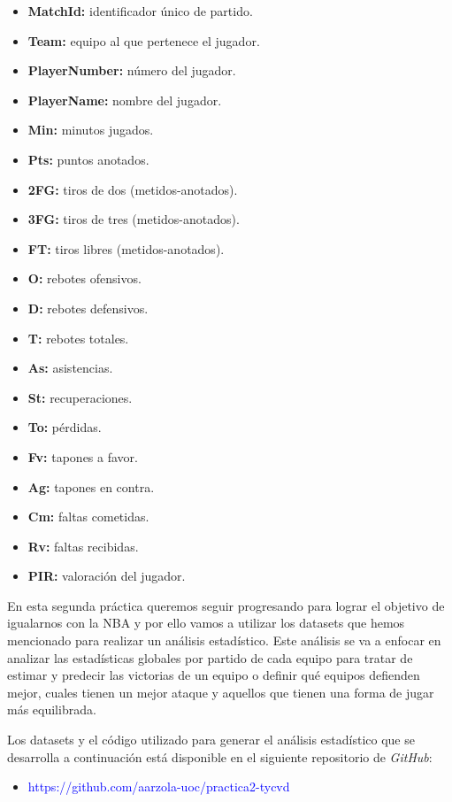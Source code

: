 \documentclass[
]{article}
\providecommand{\tightlist}{%
  \setlength{\itemsep}{0pt}\setlength{\parskip}{0pt}}
\begin{document}
\begin{itemize}
\tightlist
\item
  \textbf{MatchId:} identificador único de partido.
\item
  \textbf{Team:} equipo al que pertenece el jugador.
\item
  \textbf{PlayerNumber:} número del jugador.
\item
  \textbf{PlayerName:} nombre del jugador.
\item
  \textbf{Min:} minutos jugados.
\item
  \textbf{Pts:} puntos anotados.
\item
  \textbf{2FG:} tiros de dos (metidos-anotados).
\item
  \textbf{3FG:} tiros de tres (metidos-anotados).
\item
  \textbf{FT:} tiros libres (metidos-anotados).
\item
  \textbf{O:} rebotes ofensivos.
\item
  \textbf{D:} rebotes defensivos.
\item
  \textbf{T:} rebotes totales.
\item
  \textbf{As:} asistencias.
\item
  \textbf{St:} recuperaciones.
\item
  \textbf{To:} pérdidas.
\item
  \textbf{Fv:} tapones a favor.
\item
  \textbf{Ag:} tapones en contra.
\item
  \textbf{Cm:} faltas cometidas.
\item
  \textbf{Rv:} faltas recibidas.
\item
  \textbf{PIR:} valoración del jugador.
\end{itemize}

En esta segunda práctica queremos seguir progresando para lograr el
objetivo de igualarnos con la NBA y por ello vamos a utilizar los
datasets que hemos mencionado para realizar un análisis estadístico.
Este análisis se va a enfocar en analizar las estadísticas globales por
partido de cada equipo para tratar de estimar y predecir las victorias
de un equipo o definir qué equipos defienden mejor, cuales tienen un
mejor ataque y aquellos que tienen una forma de jugar más equilibrada.

Los datasets y el código utilizado para generar el análisis estadístico
que se desarrolla a continuación está disponible en el siguiente
repositorio de \emph{GitHub}:

\begin{itemize}
\tightlist
\item
  \textcolor{blue}{https://github.com/aarzola-uoc/practica2-tycvd}
\end{itemize}
\end{document}

